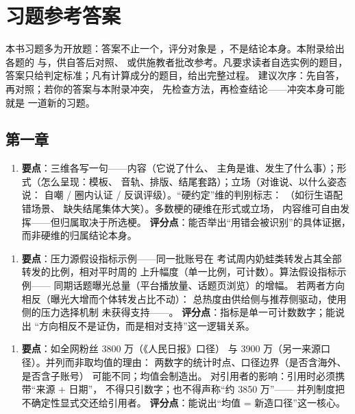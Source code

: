 \chapter{习题参考答案}\label{app:answers}

本书习题多为开放题：答案不止一个，评分对象是
，不是结论本身。本附录给出各题的
与，供自答后对照、
或供施教者批改参考。凡要求读者自选实例的题目，
答案只给判定标准；凡有计算成分的题目，给出完整过程。
建议次序：先自答，再对照；若你的答案与本附录冲突，
先检查方法，再检查结论——冲突本身可能就是
一道新的习题。

\section{第一章}\label{app:ans:01}

\begin{enumerate}[label=\textbf{1.},leftmargin=2.6em]
  \item \textbf{要点}：三维各写一句——内容（它说了什么、
        主角是谁、发生了什么事）；形式（怎么呈现：模板、
        音轨、排版、结尾套路）；立场（对谁说、以什么姿态说：
        自嘲 / 圈内认证 / 反讽评级）。“硬约定”维的判别标志：
        （如衍生语配错场景、
        缺失结尾集体大笑）。多数梗的硬维在形式或立场，
        内容维可自由发挥——但归属取决于所选梗。
        \textbf{评分点}：能否举出“用错会被识别”的具体证据，
        而非硬维的归属结论本身。
\end{enumerate}

\begin{enumerate}[label=\textbf{2.},leftmargin=2.6em]
  \item \textbf{要点}：压力源假设指标示例——同一批账号在
        考试周内奶蛙类转发占其全部转发的比例，相对平时周的
        上升幅度（单一比例，可计数）。算法假设指标示例——
        同期话题曝光总量（平台播放量、话题页浏览）的增幅。
        若两者方向相反（曝光大增而个体转发占比不动）：
        总热度由供给侧与推荐侧驱动，使用侧的压力选择机制
        未获得支持——。
        \textbf{评分点}：指标是单一可计数数字；能说出
        “方向相反不是证伪，而是相对支持”这一逻辑关系。
\end{enumerate}

\begin{enumerate}[label=\textbf{3.},leftmargin=2.6em]
  \item \textbf{要点}：如全网粉丝 3800 万（《人民日报》口径）
        与 3900 万（另一来源口径）。并列而非取均值的理由：
        两数字的统计时点、口径边界（是否含海外、是否含子账号）
        可能不同；均值会制造出。
        对引用者的影响：引用时必须携带“来源 + 日期”，
        不得只引数字；也不得声称“约 3850 万”——
        并列制度把不确定性显式交还给引用者。
        \textbf{评分点}：能说出“均值 = 新造口径”这一核心。
\end{enumerate}

